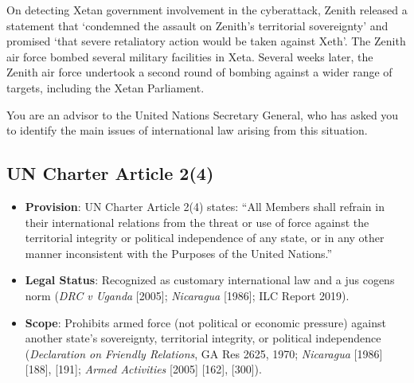 \begin{tutorialquestion}
    On detecting Xetan government involvement in the cyberattack, Zenith released a statement that `condemned the assault on Zenith's territorial sovereignty' and promised `that severe retaliatory action would be taken against Xeth'. The Zenith air force bombed several military facilities in Xeta. Several weeks later, the Zenith air force undertook a second round of bombing against a wider range of targets, including the Xetan Parliament. 
    
    \vspace{\baselineskip}
    
    You are an advisor to the United Nations Secretary General, who has asked you to identify the main issues of international law arising from this situation.
\end{tutorialquestion}

\subsection{UN Charter Article 2(4)}
\begin{itemize}
    \item \textbf{Provision}: UN Charter Article 2(4) states: “All Members shall refrain in their international relations from the threat or use of force against the territorial integrity or political independence of any state, or in any other manner inconsistent with the Purposes of the United Nations.”
    \item \textbf{Legal Status}: Recognized as customary international law and a jus cogens norm (\textit{DRC v Uganda} [2005]; \textit{Nicaragua} [1986]; ILC Report 2019).
    \item \textbf{Scope}: Prohibits armed force (not political or economic pressure) against another state’s sovereignty, territorial integrity, or political independence (\textit{Declaration on Friendly Relations}, GA Res 2625, 1970; \textit{Nicaragua} [1986] [188], [191]; \textit{Armed Activities} [2005] [162], [300]).
\end{itemize}

